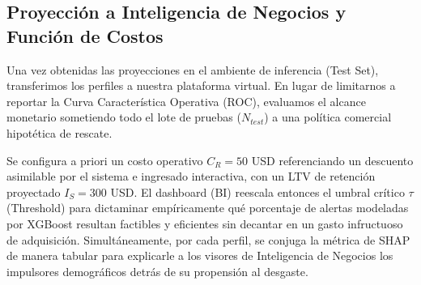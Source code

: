 \subsection{Proyección a Inteligencia de Negocios y Función de Costos}
Una vez obtenidas las proyecciones en el ambiente de inferencia (Test Set), transferimos los perfiles a nuestra plataforma virtual. En lugar de limitarnos a reportar la Curva Característica Operativa (ROC), evaluamos el alcance monetario sometiendo todo el lote de pruebas ($N_{test}$) a una política comercial hipotética de rescate.

Se configura a priori un costo operativo $C_R=50$ USD referenciando un descuento asimilable por el sistema e ingresado interactiva, con un LTV de retención proyectado $I_S=300$ USD. El dashboard (BI) reescala entonces el umbral crítico $\tau$ (Threshold) para dictaminar empíricamente qué porcentaje de alertas modeladas por XGBoost resultan factibles y eficientes sin decantar en un gasto infructuoso de adquisición. Simultáneamente, por cada perfil, se conjuga la métrica de SHAP de manera tabular para explicarle a los visores de Inteligencia de Negocios los impulsores demográficos detrás de su propensión al desgaste.
